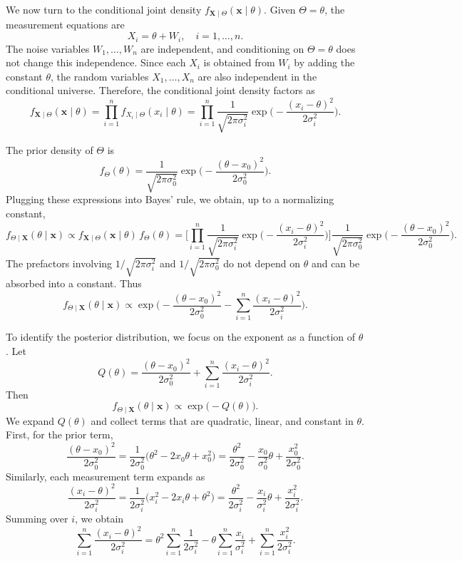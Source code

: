 We now turn to the conditional joint density \(f_{\mathbf{X}\mid\Theta}(\mathbf{x}\mid\theta)\).  
Given \(\Theta = \theta\), the measurement equations are
\[
X_i
=
\theta + W_i,
\quad
i=1,\dots,n.
\]
The noise variables \(W_1,\dots,W_n\) are independent, and conditioning on \(\Theta = \theta\) does not change this independence.  
Since each \(X_i\) is obtained from \(W_i\) by adding the constant \(\theta\), the random variables \(X_1,\dots,X_n\) are also independent in the conditional universe.  
Therefore, the conditional joint density factors as
\[
f_{\mathbf{X}\mid\Theta}(\mathbf{x}\mid\theta)
=
\prod_{i=1}^{n} f_{X_i\mid\Theta}(x_i\mid\theta)
=
\prod_{i=1}^{n}
\frac{1}{\sqrt{2\pi\sigma_{i}^{2}}}
\exp\Big(-\frac{(x_i-\theta)^{2}}{2\sigma_{i}^{2}}\Big).
\]

The prior density of \(\Theta\) is
\[
f_{\Theta}(\theta)
=
\frac{1}{\sqrt{2\pi\sigma_{0}^{2}}}
\exp\Big(-\frac{(\theta - x_0)^{2}}{2\sigma_{0}^{2}}\Big).
\]
Plugging these expressions into Bayes' rule, we obtain, up to a normalizing constant,
\[
f_{\Theta\mid \mathbf{X}}(\theta\mid \mathbf{x})
\propto
f_{\mathbf{X}\mid\Theta}(\mathbf{x}\mid\theta)\,f_{\Theta}(\theta)
=
\Bigg[
\prod_{i=1}^{n}
\frac{1}{\sqrt{2\pi\sigma_{i}^{2}}}
\exp\Big(-\frac{(x_i-\theta)^{2}}{2\sigma_{i}^{2}}\Big)
\Bigg]
\frac{1}{\sqrt{2\pi\sigma_{0}^{2}}}
\exp\Big(-\frac{(\theta - x_0)^{2}}{2\sigma_{0}^{2}}\Big).
\]
The prefactors involving \(1/\sqrt{2\pi\sigma_{i}^{2}}\) and \(1/\sqrt{2\pi\sigma_{0}^{2}}\) do not depend on \(\theta\) and can be absorbed into a constant.  
Thus
\[
f_{\Theta\mid \mathbf{X}}(\theta\mid \mathbf{x})
\propto
\exp\Bigg(
-\frac{(\theta - x_0)^{2}}{2\sigma_{0}^{2}}
-
\sum_{i=1}^{n}\frac{(x_i-\theta)^{2}}{2\sigma_{i}^{2}}
\Bigg).
\]

To identify the posterior distribution, we focus on the exponent as a function of \(\theta\).  
Let
\[
Q(\theta)
=
\frac{(\theta - x_0)^{2}}{2\sigma_{0}^{2}}
+
\sum_{i=1}^{n}\frac{(x_i-\theta)^{2}}{2\sigma_{i}^{2}}.
\]
Then
\[
f_{\Theta\mid \mathbf{X}}(\theta\mid \mathbf{x})
\propto
\exp\big(-Q(\theta)\big).
\]
We expand \(Q(\theta)\) and collect terms that are quadratic, linear, and constant in \(\theta\).  
First, for the prior term,
\[
\frac{(\theta - x_0)^{2}}{2\sigma_{0}^{2}}
=
\frac{1}{2\sigma_{0}^{2}}\big(\theta^{2} - 2x_0\theta + x_0^{2}\big)
=
\frac{\theta^{2}}{2\sigma_{0}^{2}}
-
\frac{x_0}{\sigma_{0}^{2}}\theta
+
\frac{x_0^{2}}{2\sigma_{0}^{2}}.
\]
Similarly, each measurement term expands as
\[
\frac{(x_i-\theta)^{2}}{2\sigma_{i}^{2}}
=
\frac{1}{2\sigma_{i}^{2}}\big(x_i^{2} - 2x_i\theta + \theta^{2}\big)
=
\frac{\theta^{2}}{2\sigma_{i}^{2}}
-
\frac{x_i}{\sigma_{i}^{2}}\theta
+
\frac{x_i^{2}}{2\sigma_{i}^{2}}.
\]
Summing over \(i\), we obtain
\[
\sum_{i=1}^{n}\frac{(x_i-\theta)^{2}}{2\sigma_{i}^{2}}
=
\theta^{2}\sum_{i=1}^{n}\frac{1}{2\sigma_{i}^{2}}
-
\theta\sum_{i=1}^{n}\frac{x_i}{\sigma_{i}^{2}}
+
\sum_{i=1}^{n}\frac{x_i^{2}}{2\sigma_{i}^{2}}.
\]

